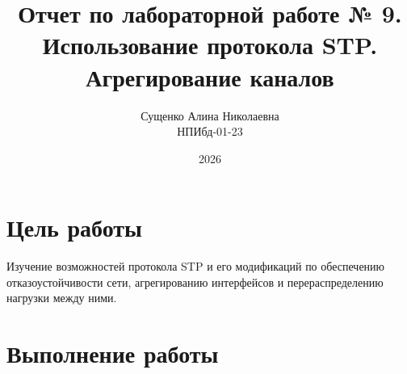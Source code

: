 

\title{Отчет по лабораторной работе № 9. \\Использование протокола STP. Агрегирование каналов}
\author{Сущенко Алина Николаевна \\ НПИбд-01-23}
\date{2026}



\maketitle
\newpage

\tableofcontents

\newpage
\section{Цель работы}
Изучение возможностей протокола STP и его модификаций по обеспечению отказоустойчивости сети, агрегированию интерфейсов и перераспределению нагрузки между ними.

\newpage
\section{Выполнение работы}

